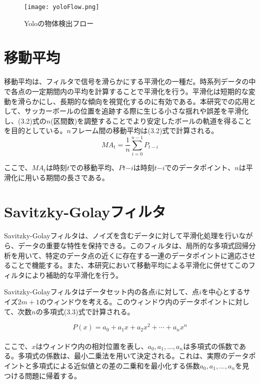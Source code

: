 \documentclass[11pt,a4j]{jreport}
\begin{document}
\begin{figure}[H]
    \centering
    \texttt{[image: yoloFlow.png]}
    \caption{Yoloの物体検出フロー}
    \label{fig:ラベル}
\end{figure}

\section{移動平均}
移動平均は、フィルタで信号を滑らかにする平滑化の一種だ。時系列データの中で各点の一定期間内の平均を計算することで平滑化を行う。\cite{計測システム}平滑化は短期的な変動を滑らかにし、長期的な傾向を視覚化するのに有効である。本研究での応用として、サッカーボールの位置を追跡する際に生じる小さな揺れや誤差を平滑化し、(3.2)式の$n$(区間数)を調整することでより安定したボールの軌道を得ることを目的としている。$n$フレーム間の移動平均は(3.2)式で計算される。
\begin{equation}
    MA_t = \frac{1}{n} \sum_{i=0}^{n-1} P_{t-i}
\end{equation}

ここで、$MA_t$は時刻$t$での移動平均、$Pt$−$i$は時刻$t$−$i$でのデータポイント、$n$は平滑化に用いる期間の長さである。

\section{Savitzky-Golayフィルタ}
Savitzky-Golayフィルタは、ノイズを含むデータに対して平滑化処理を行いながら、データの重要な特性を保持できる。\cite{SavitzkyOri}このフィルタは、局所的な多項式回帰分析を用いて、特定のデータ点の近くに存在する一連のデータポイントに適応させることで機能する。また、本研究において移動平均による平滑化に併せてこのフィルタにより補助的な平滑化を行う。

Savitzky-Golayフィルタはデータセット内の各点$i$に対して、点$i$を中心とするサイズ$2m + 1$のウィンドウを考える。このウィンドウ内のデータポイントに対して、次数$n$の多項式(3.3)式で計算される。

\begin{equation}
    P(x) = a_0 + a_1x + a_2x^2 + \cdots + a_nx^n
\end{equation}\\
ここで、$x$はウィンドウ内の相対位置を表し、$a_0, a_1, \ldots, a_n$は多項式の係数である。多項式の係数は、最小二乗法を用いて決定される。これは、実際のデータポイントと多項式による近似値との差の二乗和を最小化する係数$a_0, a_1, \ldots, a_n$を見つける問題に帰着する。

\end{document}
